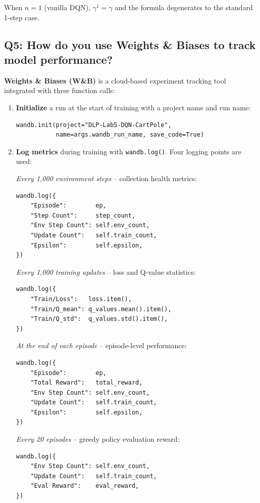 \documentclass[12pt, a4paper]{report}
\begin{document}
When $n=1$ (vanilla DQN), $\gamma^1 = \gamma$ and the formula degenerates to the standard
1-step case.

\subsection*{Q5: How do you use Weights \& Biases to track model performance?}

\textbf{Weights \& Biases (W\&B)} is a cloud-based experiment tracking tool integrated with three
function calls:

\begin{enumerate}
  \item \textbf{Initialize} a run at the start of training with a project name and run name:
\begin{lstlisting}
wandb.init(project="DLP-Lab5-DQN-CartPole",
           name=args.wandb_run_name, save_code=True)
\end{lstlisting}

  \item \textbf{Log metrics} during training with \texttt{wandb.log()}. Four logging points are
        used:

        \textit{Every 1{,}000 environment steps} -- collection health metrics:
\begin{lstlisting}
wandb.log({
    "Episode":        ep,
    "Step Count":     step_count,
    "Env Step Count": self.env_count,
    "Update Count":   self.train_count,
    "Epsilon":        self.epsilon,
})
\end{lstlisting}

        \textit{Every 1{,}000 training updates} -- loss and Q-value statistics:
\begin{lstlisting}
wandb.log({
    "Train/Loss":   loss.item(),
    "Train/Q_mean": q_values.mean().item(),
    "Train/Q_std":  q_values.std().item(),
})
\end{lstlisting}

        \textit{At the end of each episode} -- episode-level performance:
\begin{lstlisting}
wandb.log({
    "Episode":        ep,
    "Total Reward":   total_reward,
    "Env Step Count": self.env_count,
    "Update Count":   self.train_count,
    "Epsilon":        self.epsilon,
})
\end{lstlisting}

        \textit{Every 20 episodes} -- greedy policy evaluation reward:
\begin{lstlisting}
wandb.log({
    "Env Step Count": self.env_count,
    "Update Count":   self.train_count,
    "Eval Reward":    eval_reward,
})
\end{lstlisting}

\end{enumerate}
\end{document}
